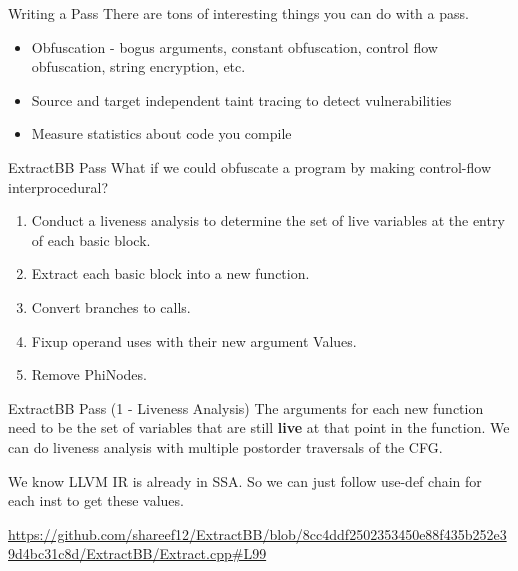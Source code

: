 \documentclass{beamer}
\begin{document}

\begin{frame}{Writing a Pass}
    There are tons of interesting things you can do with a pass.
    \begin{itemize}
        \item Obfuscation - bogus arguments, constant obfuscation, control flow obfuscation, string encryption, etc.
        \item Source and target independent taint tracing to detect vulnerabilities
        \item Measure statistics about code you compile
    \end{itemize}
\end{frame}


\begin{frame}{ExtractBB Pass}
    What if we could obfuscate a program by making control-flow interprocedural?

    \pause
    \begin{enumerate}
        \item Conduct a liveness analysis to determine the set of live variables at the entry of each basic block.
        \pause
        \item Extract each basic block into a new function.
        \pause
        \item Convert branches to calls.
        \pause
        \item Fixup operand uses with their new argument Values.
        \pause
        \item Remove PhiNodes.
    \end{enumerate}
\end{frame}

\begin{frame}[fragile]{ExtractBB Pass (1 - Liveness Analysis)}
    The arguments for each new function need to be the set of variables that are still \textbf{live} at that point in the function. We can do liveness analysis with multiple postorder traversals of the CFG.

    \vspace{1cm}
    We know LLVM IR is already in SSA. So we can just follow use-def chain for each inst to get these values.

    \url{https://github.com/shareef12/ExtractBB/blob/8cc4ddf2502353450e88f435b252e39d4bc31c8d/ExtractBB/Extract.cpp#L99}
\end{frame}
\end{document}
